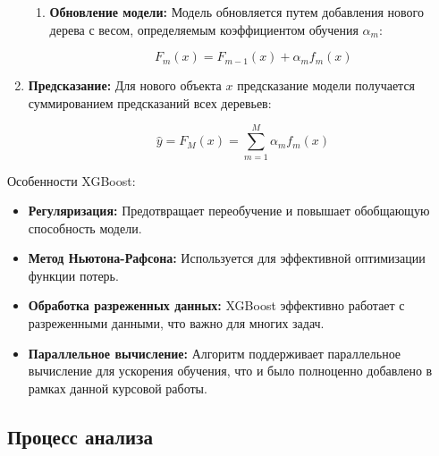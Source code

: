 \documentclass[14pt, a4paper]{extreport}
\begin{document}
\begin{enumerate}[label=\arabic*.]
\begin{enumerate}[label=\roman*.]
            \item \textbf{Обновление модели:} Модель обновляется путем добавления нового дерева с весом, определяемым коэффициентом обучения $\alpha_m$:

            \[F_m(x) = F_{m-1}(x) + \alpha_m f_m(x)\]
        \end{enumerate}

        \item \textbf{Предсказание:}
        Для нового объекта $x$ предсказание модели получается суммированием предсказаний всех деревьев:

        \[\hat{y} = F_M(x) = \sum_{m=1}^M \alpha_m f_m(x)\]
    \end{enumerate}

    Особенности XGBoost:

    \begin{itemize}
        \item \textbf{Регуляризация:} Предотвращает переобучение и повышает обобщающую способность модели.
        \item \textbf{Метод Ньютона-Рафсона:} Используется для эффективной оптимизации функции потерь.
        \item \textbf{Обработка разреженных данных:} XGBoost эффективно работает с разреженными данными, что важно для многих задач.
        \item \textbf{Параллельное вычисление:} Алгоритм поддерживает параллельное вычисление для ускорения обучения, что и было полноценно добавлено в рамках данной курсовой работы.
    \end{itemize}

    \subsection{Процесс анализа}
\end{document}
